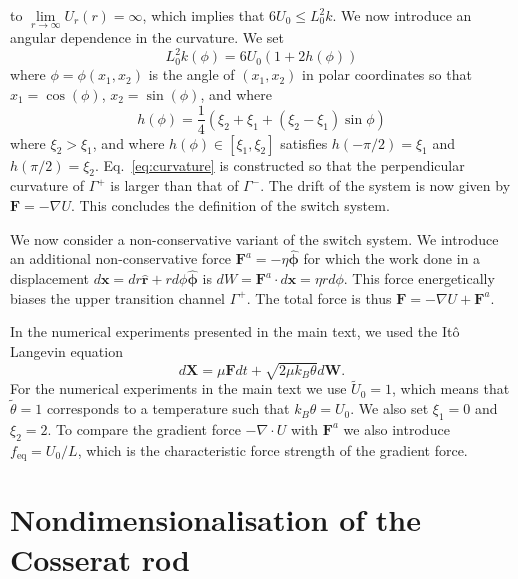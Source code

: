 \documentclass[withindex,glossary,techreport]{cam-thesis}
\begin{document}
to $\underset{r\to\infty}{\lim}U_{r}(r)=\infty$, which implies that
$6U_{0}\leq L_0^{2}k$. We now introduce an angular dependence in the
curvature. We set
\begin{equation}
L_0^{2}k(\phi)=6U_{0}(1+2h(\phi))\label{eq:curvature}
\end{equation}
where $\phi=\phi(x_{1},x_{2})$ is the angle of $(x_{1},x_{2})$ in
polar coordinates so that $x_{1}=\cos(\phi)$, $x_{2}=\sin(\phi)$,
and where
\begin{equation}
h(\phi)=\frac{1}{4}\left(\xi_{2}+\xi_{1}+(\xi_{2}-\xi_{1})\sin\phi\right)
\end{equation}
where $\xi_{2}>\xi_{1}$, and where $h(\phi)\in[\xi_{1},\xi_{2}]$
satisfies $h(-\pi/2)=\xi_{1}$ and $h(\pi/2)=\xi_{2}$. Eq.~\eqref{eq:curvature}
is constructed so that the perpendicular curvature of $\Gamma^{+}$
is larger than that of $\Gamma^{-}$. The drift of the system is now
given by $\mathbf{F}=-\nabla U$. This concludes the definition of the switch system.

We now consider a non-conservative variant of the switch system. We introduce an additional non-conservative
force $\mathbf{F}^{a}=-\eta\hat{\boldsymbol{\phi}}$ for which the
work done in a displacement $d\mathbf{x}=dr\hat{\mathbf{r}}+rd\phi\hat{\boldsymbol{\phi}}$
is $dW=\mathbf{F}^{a}\cdot d\mathbf{x}=\eta rd\phi$. This force energetically
biases the upper transition channel $\Gamma^{+}$. The total force
is thus $\mathbf{F}=-\nabla U+\mathbf{F}^{a}$.

In the numerical experiments presented in the main text, we used the
Itô Langevin equation 
\begin{equation}
d\mathbf{X}=\mu\mathbf{F}dt+\sqrt{2\mu k_{B}\theta}d\mathbf{W}.\label{eq:langevin equation}
\end{equation}
For the numerical experiments in the main text  we use $\tilde{U}_{0}=1$,
which means that $\tilde{\theta}=1$ corresponds to a temperature
such that $k_{B}\theta=U_{0}$. We also set $\xi_{1}=0$ and $\xi_{2}=2$.
To compare the gradient force $-\nabla \cdot U$ with $\mathbf{F}^{a}$ we also introduce
$f_{\text{eq}}=U_{0}/L$, which is the characteristic force strength
of the gradient force.




\chapter{Nondimensionalisation of the Cosserat rod} \label{app:Nondimensionalisation of the Cosserat rod}
\end{document}
